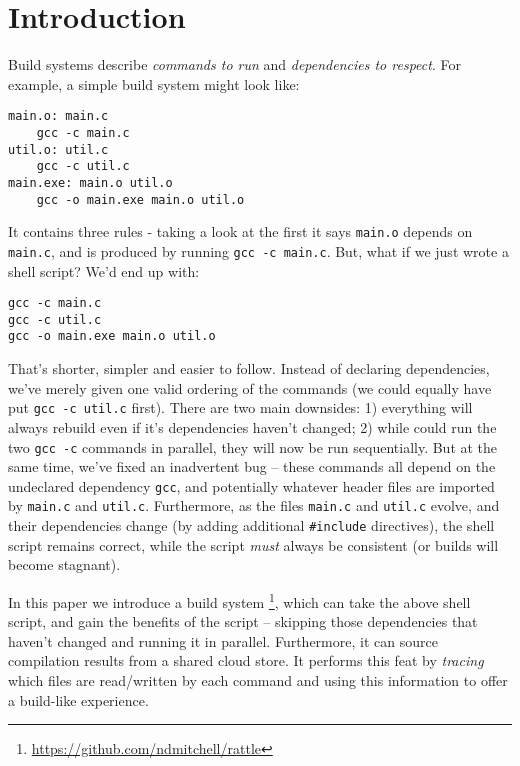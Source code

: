 \section{Introduction}
\label{sec:introduction}

Build systems \citep{build_systems_a_la_carte} describe \emph{commands to run} and \emph{dependencies to respect}. For example, a simple \Make build system might look like:

\begin{verbatim}
main.o: main.c
    gcc -c main.c
util.o: util.c
    gcc -c util.c
main.exe: main.o util.o
    gcc -o main.exe main.o util.o
\end{verbatim}

It contains three rules - taking a look at the first it says \texttt{main.o} depends on \texttt{main.c}, and is produced by running \texttt{gcc -c main.c}. But, what if we just wrote a shell script? We'd end up with:

\begin{verbatim}
gcc -c main.c
gcc -c util.c
gcc -o main.exe main.o util.o
\end{verbatim}

That's shorter, simpler and easier to follow. Instead of declaring dependencies, we've merely given one valid ordering of the commands (we could equally have put \texttt{gcc -c util.c} first). There are two main downsides: 1) everything will always rebuild even if it's dependencies haven't changed; 2) while \Make could run the two \texttt{gcc -c} commands in parallel, they will now be run sequentially. But at the same time, we've fixed an inadvertent bug -- these commands all depend on the undeclared dependency \texttt{gcc}, and potentially whatever header files are imported by \texttt{main.c} and \texttt{util.c}. Furthermore, as the files \texttt{main.c} and \texttt{util.c} evolve, and their dependencies change (by adding additional \texttt{\#include} directives), the shell script remains correct, while the \Make script \emph{must} always be consistent (or builds will become stagnant).

In this paper we introduce a build system \Rattle\footnote{\url{https://github.com/ndmitchell/rattle}}, which can take the above shell script, and gain the benefits of the \Make script -- skipping those dependencies that haven't changed and running it in parallel. Furthermore, it can source compilation results from a shared cloud store. It performs this feat by \emph{tracing} which files are read/written by each command and using this information to offer a build-like experience.

